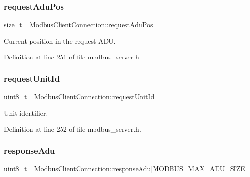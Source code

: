 \subsubsection{\texorpdfstring{request\+Adu\+Pos}{requestAduPos}}
{\footnotesize\ttfamily size\+\_\+t \+\_\+\+Modbus\+Client\+Connection\+::request\+Adu\+Pos}



Current position in the request A\+DU. 



Definition at line 251 of file modbus\+\_\+server.\+h.

\mbox{\label{struct__ModbusClientConnection_a118d3697095f84f1628d6335959ddcfd}} 
\subsubsection{\texorpdfstring{request\+Unit\+Id}{requestUnitId}}
{\footnotesize\ttfamily \hyperlink{stdint_8h_aba7bc1797add20fe3efdf37ced1182c5}{uint8\+\_\+t} \+\_\+\+Modbus\+Client\+Connection\+::request\+Unit\+Id}



Unit identifier. 



Definition at line 252 of file modbus\+\_\+server.\+h.

\mbox{\label{struct__ModbusClientConnection_ada58ec2f39f9b8b4985068c7c33a99a1}} 
\subsubsection{\texorpdfstring{response\+Adu}{responseAdu}}
{\footnotesize\ttfamily \hyperlink{stdint_8h_aba7bc1797add20fe3efdf37ced1182c5}{uint8\+\_\+t} \+\_\+\+Modbus\+Client\+Connection\+::response\+Adu\mbox{[}\hyperlink{modbus__common_8h_a2c01d2b429ca01511f3f6b8c63edfda8}{M\+O\+D\+B\+U\+S\+\_\+\+M\+A\+X\+\_\+\+A\+D\+U\+\_\+\+S\+I\+ZE}\mbox{]}}



